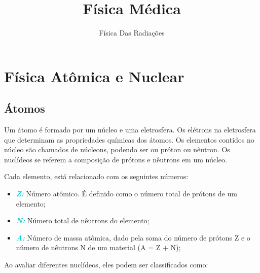 \documentclass[11pt,a4paper]{article}
\title{\LobsterTwo\Huge{Física Médica}}
\author{\LobsterTwo\Large{Física Das Radiações\nocite{*}}}
\date{\LobsterTwo{Dalila Mendonça}}
\begin{document}
	\maketitle


\section{Física Atômica e Nuclear}

\subsection*{Átomos}

    Um átomo é formado por um núcleo e uma eletrosfera. Os elétrons na eletrosfera que determinam as propriedades químicas dos átomos. Os elementos contidos no núcleo são chamados de núcleons, podendo ser ou próton ou nêutron. Os nuclídeos se referem a composição de prótons e nêutrons em um núcleo.

    Cada elemento, está relacionado com os seguintes números:

    \begin{itemize}
            \item \textbf{\textit{\textcolor{DarkTurquoise}{Z:}}} Número atômico. É definido como o número total de prótons de um elemento;
            \item \textbf{\textit{\textcolor{DarkTurquoise}{N:}}} Número total de nêutrons do elemento;
            \item \textbf{\textit{\textcolor{DarkTurquoise}{A:}}} Número de massa atômica, dado pela soma do número de prótons Z e o número de nêutrons N de um material (A = Z + N);
    \end{itemize}
            
    Ao avaliar diferentes nuclídeos, eles podem ser classificados como:
\end{document}
